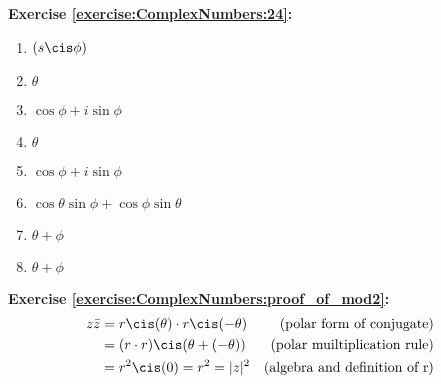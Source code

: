 \noindent\textbf{Exercise \ref{exercise:ComplexNumbers:24}:} %
\begin{multicols}{2}
\begin{enumerate}
\item
$(s\cis\phi)$

\item
$\theta$

\item
$\cos\phi+i\sin\phi$
 
\item
$\theta$

\item
$\cos\phi+i\sin\phi$

\item
$\cos\theta \sin\phi + \cos\phi \sin\theta$

\item
$\theta+\phi$

\item
$\theta+\phi$
\end{enumerate}
\end{multicols}

\noindent\textbf{Exercise \ref{exercise:ComplexNumbers:proof_of_mod2}:} 
\begin{align}
z \bar{z} &= r \cis (\theta) \cdot r \cis (-\theta) & (\textrm{polar form of conjugate}) \\
 &= (r \cdot r) \cis(\theta + (-\theta))  & (\textrm{polar muiltiplication rule}) \\
 &= r^2 \cis(0) = r^2 = |z|^2  & (\textrm{algebra and definition of r})
 \end{align}

